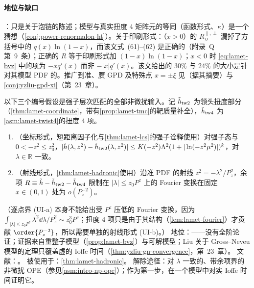 \paragraph{地位与缺口}
\tagP：只是关于泡链的陈述；模型与真实扭度 4 矩阵元的等同（函数形式、$\kappa$）是一个猜想（\cref{conj:power-renormalon-ht}）。关于印刷形式：\cite[式~(63)--(64)]{Braun:2018brg}（$x>0$）的 $R^{\parallel,\perp}_{\mathcal Q}$ 漏掉了方括号中的 $q(x)\ln(1-x)$，而该文式~(61)--(62) 是正确的（附录~Q 第~9~条）；正确的 $R$ 等于印刷形式加 $(1-x)\ln(1-x)$；$x<0$ 时 \cref{eq:lamet-bvz} 中的项为 $-xq'(x)$ 而非 $-|x|q'(x)$。该文给出的 $30\%$ 与 $24\%$ 的大小是针对其模型 PDF 的。推广到准、赝 GPD 及特殊点 $x=\pm\xi$ 见\cite{Braun:2024snf}（据其摘要）与\cref{conj:yzliu-gpd-xi}（第~23~章）。

以下三个编号假设是强子层次匹配的全部非微扰输入。记 $\tilde h_{\rm tw2}$ 为领头扭度部分（\cref{thm:lamet-coordinate}，带有\cref{prop:lamet-tmc}的靶质量补全），$\tilde h_{\rm tw4}$ 为\cref{asm:lamet-twist4}的扭度 4 项。

\begin{assumption}\label{asm:lamet-uniform}
\begin{enumerate}[label=(UI-\alph*),leftmargin=3.4em,itemsep=1pt,topsep=2pt]
\item （坐标形式，短距离因子化与\cref{thm:lamet-lcs}的强子诠释使用）对强子态与 $0<-z^2\le z_0^2$，$|\tilde h(\lambda,z^2)-\tilde h_{\rm tw2}(\lambda,z^2)|\le K(-z^2)\Lambda^2(1+|\ln(-z^2\mu^2)|)^k$，对 $\lambda\in\mathbb R$ 一致。
\item （射线形式，\cref{thm:lamet-hadronic}使用）沿准 PDF 的射线 $z^2=-\lambda^2/P_z^2$，余项 $R\equiv\tilde h-\tilde h_{\rm tw2}-\tilde h_{\rm tw4}$ 限制在 $|\lambda|\le z_0P^z$ 上的 Fourier 变换在固定 $x\in(0,1)$ 处为 $o(P_z^{-2})$。
\end{enumerate}
（逐点界 (UI-a) 本身不能给出受 $P^z$ 压低的 Fourier 变换，因为 $\int_{|\lambda|\le z_0P^z}\lambda^2\dd\lambda/P_z^2\sim z_0^3P^z$；扭度 4 项只是由于其结构（\cref{lem:lamet-fourier}）才贡献 $\order{P_z^{-2}}$，所以需要单独的射线形式 (UI-b)。）
地位：\tagC——没有全阶论证；证据来自重整子模型（\cref{prop:lamet-bvz}）与可解模型；Liu 关于 Gross--Neveu 模型的定理只覆盖虚的 Ioffe 时间（\cref{thm:yzliu-gn-convergence}，第~23~章）。
文献：\cite{IzubuchiEtAl2018,Braun:2018brg,JiEtAl2021}。
被使用于：\cref{thm:lamet-hadronic}。
解除途径：对 $\lambda$ 一致的、带余项界的非微扰 OPE（参见\cref{asm:intro-np-ope}）；作为第一步，在一个模型中对实 Ioffe 时间证明它。
\end{assumption}

